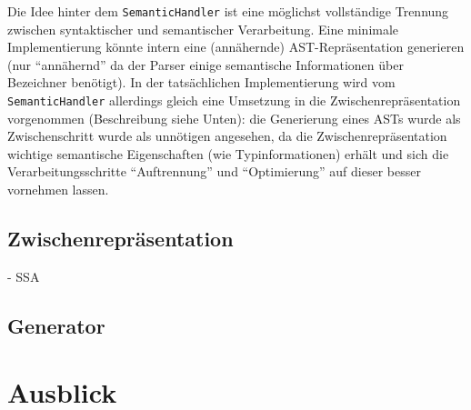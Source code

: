 \documentclass[twoside,a4paper,fleqn,12pt]{article}
\begin{document}
Die Idee hinter dem \verb+SemanticHandler+ ist eine möglichst vollständige Trennung zwischen syntaktischer
und semantischer Verarbeitung. Eine minimale Implementierung könnte intern eine (annähernde)
AST-Repräsentation generieren (nur "`annähernd"' da der Parser einige semantische Informationen über
Bezeichner benötigt). In der tatsächlichen Implementierung wird vom \verb+SemanticHandler+ allerdings 
gleich eine Umsetzung in die Zwischenrepräsentation vorgenommen (Beschreibung siehe Unten):
die Generierung eines ASTs wurde als Zwischenschritt wurde als unnötigen angesehen, da die Zwischenrepräsentation
wichtige semantische Eigenschaften (wie Typinformationen) erhält und sich die Verarbeitungsschritte "`Auftrennung"'
und "`Optimierung"' auf dieser besser vornehmen lassen.

\subsection{Zwischenrepräsentation}

- SSA

\subsection{Generator}



\section{Ausblick}

\cleardoublepage
\appendix

\end{document}
